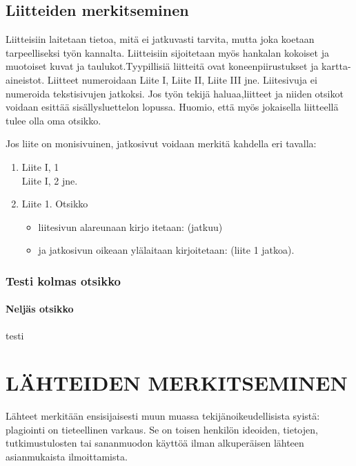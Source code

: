\documentclass{LUT_pohja}[2016/03/09 LUT Dippa Pohja]
\begin{document}
\subsection{Liitteiden merkitseminen}
Liitteisiin laitetaan tietoa, mitä ei jatkuvasti tarvita, mutta joka koetaan tarpeelliseksi työn kannalta. Liitteisiin sijoitetaan myös hankalan kokoiset ja muotoiset kuvat ja taulukot.Tyypillisiä liitteitä ovat koneenpiirustukset ja kartta-aineistot. Liitteet numeroidaan Liite I, Liite II, Liite III jne. Liitesivuja ei numeroida tekstisivujen jatkoksi. Jos työn tekijä haluaa,liitteet ja niiden otsikot voidaan esittää sisällysluettelon lopussa. Huomio, että myös jokaisella liitteellä tulee olla oma otsikko.\par

Jos liite on monisivuinen, jatkosivut voidaan merkitä kahdella eri tavalla:
\begin{enumerate}[1),noitemsep, nolistsep, topsep=-1em]
\item Liite I, 1\\
Liite I, 2 jne. 
\item Liite 1. Otsikko
\begin{itemize}
\item liitesivun alareunaan kirjo itetaan: (jatkuu) 
\item ja jatkosivun oikeaan ylälaitaan kirjoitetaan: (liite 1 jatkoa).
\end{itemize}
\end{enumerate}
\subsubsection{Testi kolmas otsikko}
\paragraph{Neljäs otsikko}%
testi

\newpage
\section{LÄHTEIDEN MERKITSEMINEN}
Lähteet merkitään ensisijaisesti muun muassa tekijänoikeudellisista syistä: plagiointi on tieteellinen varkaus. Se on toisen  henkilön  ideoiden,  tietojen,  tutkimustulosten tai sananmuodon käyttöä ilman alkuperäisen lähteen asianmukaista ilmoittamista. \cite[s. 110-111.]{Hirsjarvi05}\par
\end{document}
